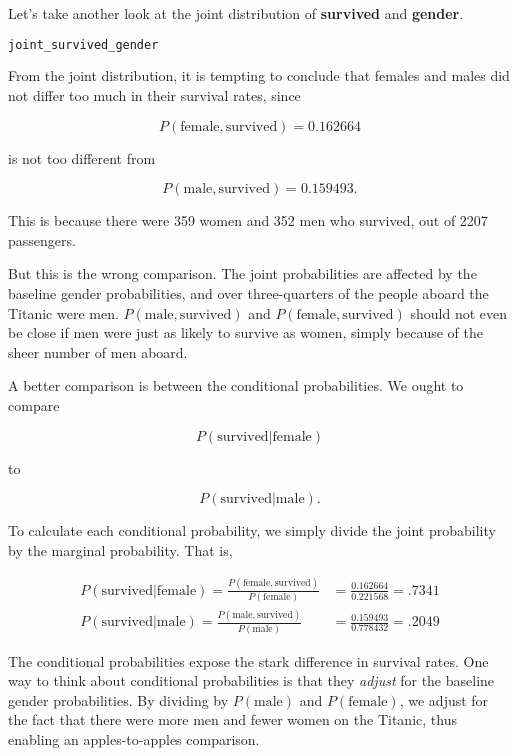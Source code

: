 Let's take another look at the joint distribution of \textbf{survived} and \textbf{gender}.

\begin{lstlisting}[language=Python]
joint_survived_gender
\end{lstlisting}




From the joint distribution, it is tempting to conclude that females and males did not differ too much in their survival rates, since

$$ P(\text{female}, \text{survived}) = 0.162664 $$

is not too different from

$$ P(\text{male}, \text{survived}) = 0.159493. $$

This is because there were 359 women and 352 men who survived, out of 2207 passengers.

But this is the wrong comparison. The joint probabilities are affected by the baseline gender probabilities, and over three-quarters of the people aboard the Titanic were men. $P(\text{male}, \text{survived})$ and $ P(\text{female}, \text{survived})$ should not even be close if men were just as likely to survive as women, simply because of the sheer number of men aboard.



A better comparison is between the conditional probabilities. We ought to compare

$$ P(\text{survived} | \text{female}) $$

to

$$ P(\text{survived} | \text{male}). $$

To calculate each conditional probability, we simply divide the joint probability by the marginal probability. That is,

\begin{align}
P(\text{survived} | \text{female}) = \frac{P(\text{female}, \text{survived})}{P(\text{female})} &= \frac{0.162664}{0.221568} = .7341 \\
P(\text{survived} | \text{male}) = \frac{P(\text{male}, \text{survived})}{P(\text{male})} &= \frac{0.159493}{0.778432} = .2049\end{align}

The conditional probabilities expose the stark difference in survival rates. One way to think about conditional probabilities is that they \textit{adjust} for the baseline gender probabilities. By dividing by $P(\text{male})$ and $P(\text{female})$, we adjust for the fact that there were more men and fewer women on the Titanic, thus enabling an apples-to-apples comparison.



